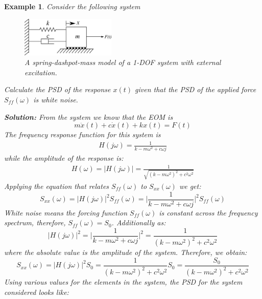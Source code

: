 \documentclass[12pt,letter]{article}
\newtheorem{ex}{Example}
\numberwithin{ex}{section} %
\newenvironment{example}{\begin{mdframed}[middlelinewidth=0.5mm]\begin{ex}\normalfont}{\end{ex}\end{mdframed}}
\numberwithin{re}{section} %
\numberwithin{equation}{section}	%
\begin{document}
\begin{example}
	Consider the following system
	\begin{figure}[H]
		\centering
		\includegraphics[width=0.4\textwidth]{../figures/1-DOF-spring_dashpot_mass_horizontal_forced.png}
		\caption{A spring-dashpot-mass model of a 1-DOF system with external excitation.}
	\end{figure}
	Calculate the PSD of the response $x(t)$ given that the PSD of the applied force $S_{ff}(\omega)$ is white noise. 
	
	\noindent\textbf{Solution:} From the system we know that the EOM is 
	\begin{equation}
	m\ddot{x}(t) +c\dot{x}(t) + kx(t) = F(t)
	\end{equation} 
	The frequency response function for this system is 
	\begin{eqnarray}
		H(j\omega) = \frac{1}{k-m\omega^2+c\omega j}
	\end{eqnarray}
	while the amplitude of the response is:
	\begin{eqnarray}
	H(\omega) = |H(j\omega)| = \frac{1}{\sqrt{(k-m\omega^2)^2+c^2\omega^2}}
	\end{eqnarray}
	Applying the equation that relates $S_{ff}(\omega)$ to $S_{xx}(\omega)$ we get:
	\begin{equation}
	S_{xx}(\omega) =  |H(j\omega)|^2 S_{ff}(\omega) = \bigg|\frac{1}{k-m\omega^2+c\omega j} \bigg|^2 S_{ff}(\omega) 
	\end{equation}
	White noise means the forcing function $S_{ff}(\omega)$ is constant across the frequency spectrum, therefore, $S_{ff}(\omega)=S_0$. Additionally as:
	\begin{equation}
	|H(j\omega)|^2 = \bigg|\frac{1}{k-m\omega^2+c\omega j} \bigg|^2 = \frac{1}{(k-m\omega^2)^2+c^2\omega^2}
	\end{equation}
	where the absolute value is the amplitude of the system. Therefore, we obtain:
	\begin{equation}
	S_{xx}(\omega) =  |H(j\omega)|^2 S_{0}= \frac{1}{(k-m\omega^2)^2+c^2\omega^2}S_0 = \frac{S_0}{(k-m\omega^2)^2+c^2\omega^2}
	\end{equation}
	Using various values for the elements in the system, the PSD for the system considered looks like:
	\begin{figure}[H]

\end{figure}
\end{example}
\end{document}
